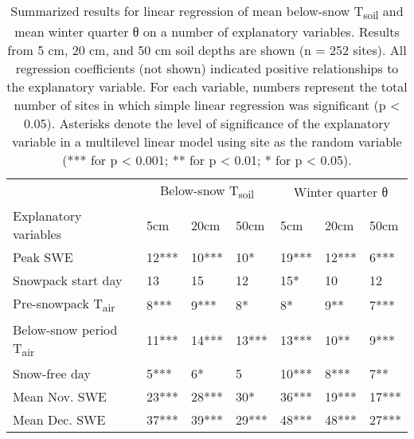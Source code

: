 
\begin{table}[p]

\centering

\caption{Summarized results for linear regression of mean below-snow T\textsubscript{soil} and mean winter quarter θ on a number of explanatory variables. Results from 5 cm, 20 cm, and 50 cm soil depths are shown (n = 252 sites). All regression coefficients (not shown) indicated positive relationships to the explanatory variable. For each variable, numbers represent the total number of sites in which simple linear regression was significant (p < 0.05). Asterisks denote the level of significance of the explanatory variable in a multilevel linear model using site as the random variable (*** for p < 0.001; ** for p < 0.01; * for p < 0.05).\label{regression_winter_t}}

\begin{tabular}{lllllll}
\toprule
{} & \multicolumn{3}{c}{Below-snow T\textsubscript{soil}} & \multicolumn{3}{c}{Winter quarter θ}\\


\cmidrule(l){2-4} \cmidrule(l){5-7}

Explanatory variables	&5cm	&20cm	&50cm	&5cm	&20cm	&50cm\\
\midrule
Peak SWE	&12***	&10***	&10*	&19***	&12***	&6***\\
Snowpack start day	&13	&15	&12	&15*	&10	&12\\
Pre-snowpack T\textsubscript{air}	&8***	&9***	&8*	&8*	&9**	&7***\\
Below-snow period T\textsubscript{air}	&11***	&14***	&13***	&13***	&10**	&9***\\
Snow-free day	&5***	&6*	&5	&10***	&8***	&7**\\
Mean Nov. SWE	&23***	&28***	&30*	&36***	&19***	&17***\\
Mean Dec. SWE	&37***	&39***	&29***	&48***	&48***	&27***\\
\bottomrule
\end{tabular}

\end{table}
